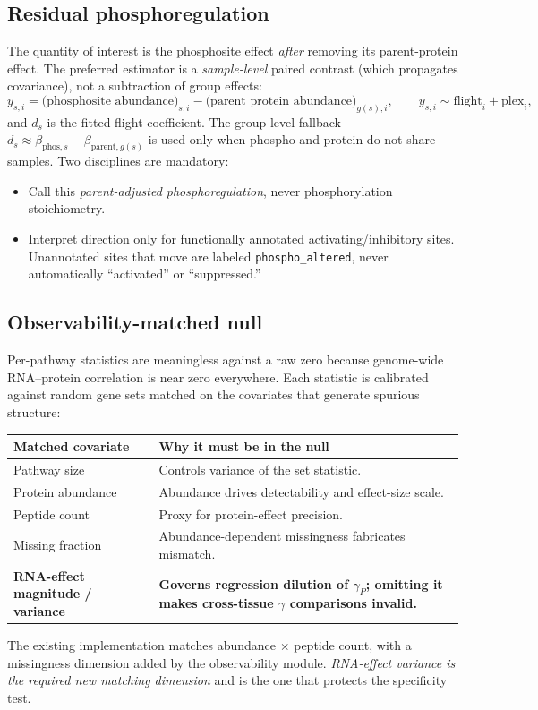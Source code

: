 \documentclass[11pt]{article}
\newcommand{\Cphoalt}{\texttt{phospho\_altered}}
\begin{document}
\subsection{Residual phosphoregulation}
The quantity of interest is the phosphosite effect \emph{after} removing its parent-protein effect. The
preferred estimator is a \emph{sample-level} paired contrast (which propagates covariance), not a
subtraction of group effects:
\begin{equation}
y_{s,i} = \big(\text{phosphosite abundance}\big)_{s,i} - \big(\text{parent protein abundance}\big)_{g(s),i},
\qquad y_{s,i} \sim \text{flight}_i + \text{plex}_i,
\label{eq:ds}
\end{equation}
and $d_s$ is the fitted flight coefficient. The group-level fallback $d_s \approx
\beta_{\text{phos},s}-\beta_{\text{parent},g(s)}$ is used only when phospho and protein do not share
samples. Two disciplines are mandatory:
\begin{itemize}
\item Call this \emph{parent-adjusted phosphoregulation}, never phosphorylation stoichiometry.
\item Interpret direction only for functionally annotated activating/inhibitory sites. Unannotated sites
that move are labeled \Cphoalt{}, never automatically ``activated'' or ``suppressed.''
\end{itemize}

\subsection{Observability-matched null}\label{sec:null}
Per-pathway statistics are meaningless against a raw zero because genome-wide RNA--protein correlation is
near zero everywhere. Each statistic is calibrated against random gene sets matched on the covariates that
generate spurious structure:
\begin{center}\small
\begin{tabularx}{\textwidth}{@{}p{4.3cm} L@{}}
\toprule
\textbf{Matched covariate} & \textbf{Why it must be in the null} \\
\midrule
Pathway size & Controls variance of the set statistic. \\
Protein abundance & Abundance drives detectability and effect-size scale. \\
Peptide count & Proxy for protein-effect precision. \\
Missing fraction & Abundance-dependent missingness fabricates mismatch. \\
\textbf{RNA-effect magnitude / variance} & \textbf{Governs regression dilution of $\gamma_P$; omitting it makes cross-tissue $\gamma$ comparisons invalid.} \\
\bottomrule
\end{tabularx}
\end{center}
\noindent The existing implementation matches abundance $\times$ peptide count, with a missingness dimension
added by the observability module. \emph{RNA-effect variance is the required new matching dimension} and is
the one that protects the specificity test.
\end{document}

